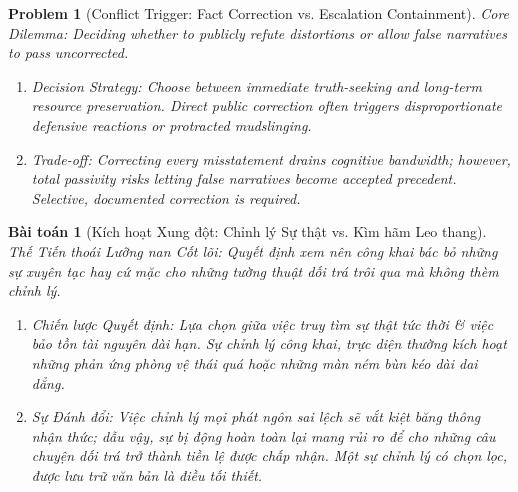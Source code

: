\documentclass{article}
\newtheorem{problem}{Problem}
\newtheorem{baitoan}{Bài toán}
\begin{document}
\begin{problem}[Conflict Trigger: Fact Correction vs. Escalation Containment]
	\emph{Core Dilemma:} Deciding whether to publicly refute distortions or allow false narratives to pass uncorrected.
	\begin{enumerate}[label=(\roman*)]
		\item \emph{Decision Strategy:} Choose between immediate truth-seeking and long-term resource preservation. Direct public correction often triggers disproportionate defensive reactions or protracted mudslinging.
		\item \emph{Trade-off:} Correcting every misstatement drains cognitive bandwidth; however, total passivity risks letting false narratives become accepted precedent. Selective, documented correction is required.
	\end{enumerate}
\end{problem}
\begin{baitoan}[Kích hoạt Xung đột: Chỉnh lý Sự thật vs. Kìm hãm Leo thang]
	\emph{Thế Tiến thoái Lưỡng nan Cốt lõi:} Quyết định xem nên công khai bác bỏ những sự xuyên tạc hay cứ mặc cho những tường thuật dối trá trôi qua mà không thèm chỉnh lý.
	\begin{enumerate}[label=(\roman*)]
		\item \emph{Chiến lược Quyết định:} Lựa chọn giữa việc truy tìm sự thật tức thời \& việc bảo tồn tài nguyên dài hạn. Sự chỉnh lý công khai, trực diện thường kích hoạt những phản ứng phòng vệ thái quá hoặc những màn ném bùn kéo dài dai dẳng.
		\item \emph{Sự Đánh đổi:} Việc chỉnh lý mọi phát ngôn sai lệch sẽ vắt kiệt băng thông nhận thức; dẫu vậy, sự bị động hoàn toàn lại mang rủi ro để cho những câu chuyện dối trá trở thành tiền lệ được chấp nhận. Một sự chỉnh lý có chọn lọc, được lưu trữ văn bản là điều tối thiết.
	\end{enumerate}
\end{baitoan}
\end{document}
